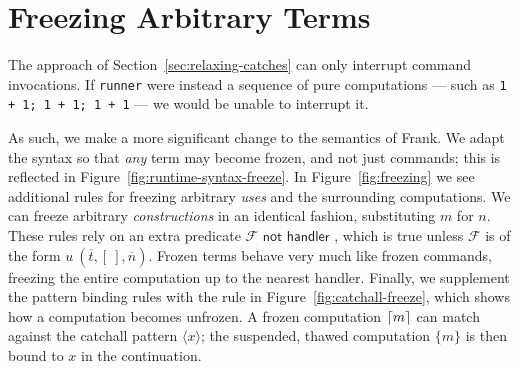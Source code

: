 \documentclass[msc,deptreport,cs]{infthesis} %
\newcommand{\code}[1]{\lstinline{#1}}
\DeclarePairedDelimiter{\ceil}{\lceil}{\rceil}
\newcommand{\todo}[1]
           {{\par\noindent\small\color{RoyalPurple}
  \framebox{\parbox{\dimexpr\linewidth-2\fboxsep-2\fboxrule}
    {\textbf{TODO:} #1}}}}
\newcommand{\many}{\overline}
\newcommand{\thunk}[1]{\{{#1}\}}
\newcommand{\effin}[1]{\langle {#1} \rangle}
\newcommand{\EF}{\mathcal{F}}
\newcommand{\freeze}{\ceil}
\begin{document}


\section{Freezing Arbitrary Terms}
\label{sec:freezing-terms}

The approach of Section~\ref{sec:relaxing-catches} can only interrupt command
invocations. If \code{runner} were instead a sequence of pure computations ---
such as \code{1 + 1; 1 + 1; 1 + 1} --- we would be unable to interrupt it.

As such, we make a more significant change to the semantics of Frank. We adapt
the syntax so that \emph{any} term may become frozen, and not just commands;
this is reflected in Figure~\ref{fig:runtime-syntax-freeze}. In
Figure~\ref{fig:freezing} we see additional rules for freezing arbitrary
\emph{uses} and the surrounding computations. We can freeze arbitrary
\emph{constructions} in an identical fashion, substituting $m$ for $n$. These
rules rely on an extra predicate $\EF \textsf{ not handler }$, which is true
unless $\EF$ is of the form $u~(\many{t}, [~], \many{n})$. Frozen terms behave
very much like frozen commands, freezing the entire computation up to the
nearest handler. Finally, we supplement the pattern binding rules with the rule
in Figure~\ref{fig:catchall-freeze}, which shows how a computation becomes
unfrozen. A frozen computation $\freeze{m}$ can match against the catchall
pattern $\effin{x}$; the suspended, thawed computation $\thunk{m}$ is then bound
to $x$ in the continuation.
\end{document}
